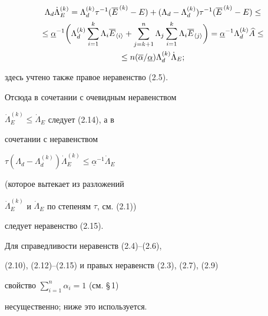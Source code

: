 \begin{pf}
\begin{gather*}


\Lambda_d\Dot\Lambda^{(k)}_E=\Lambda_d^{(k)}\tau^{-1}


(\overline E^{\,(k)}-E)+(\Lambda_d-\Lambda_d^{(k)})\tau^{-1}


(\overline E^{\,(k)}-E)\le \\


%


\le\underline\alpha^{-1}\biggl(\Lambda_d^{(k)}\sum_{i=1}^k\Lambda_i


\overline E_{\langle i\rangle}+\sum_{j=k+1}^n\Lambda_j\sum_{i=1}^k\Lambda_i


\overline E_{\langle j\rangle}\biggr )=\underline\alpha^{-1}\Lambda_d^{(k)}\aaa\le \\


%


\le n(\overline\alpha/\underline\alpha)\Lambda_d^{(k)}\Dot\Lambda_E;


\end{gather*}


здесь учтено также правое неравенство (2.5).





Отсюда в сочетании с очевидным неравенством


$\Dot\Lambda^{(k)}_E\le\Dot\Lambda_E$ следует (2.14), а в 


сочетании с неравенством 


$\tau(\Lambda_d-\Lambda_d^{(k)})\Dot\Lambda_E^{(k)}\le


\underline\alpha^{-1}\dot\Lambda_E$


(которое вытекает из разложений


$\Dot\Lambda_E^{(k)}$ и $\Dot\Lambda_E$ по степеням $\tau$, см. (2.1))


следует неравенство (2.15).


\end{pf}





\begin{note} Для справедливости неравенств (2.4)--(2.6),


(2.10), (2.12)--(2.15) и правых неравенств (2.3), (2.7), (2.9)


свойство $\sum_{i=1}^n\alpha_i=1$ (см. \S\,1)


несущественно; ниже это используется.


\end{note}





